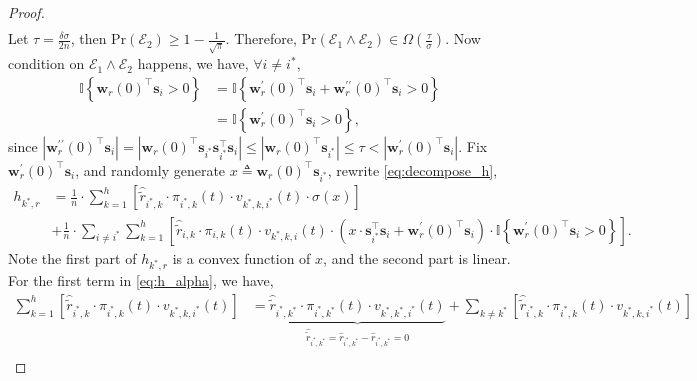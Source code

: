 \documentclass[10pt]{article}
\def\rvs{{\mathbf{s}}}
\def\rvw{{\mathbf{w}}}
\def\pr{{\text{Pr}}}
\def\sI{{\mathbb{I}}}
\def\gE{{\mathcal{E}}}
\begin{document}
\begin{proof}
\begin{equation*}
\begin{split}
\end{split}
\end{equation*}
Let $\tau = \frac{\delta\sigma}{2n}$, then $\pr\left(\gE_2\right) \ge 1 - \frac{1}{\sqrt{\pi}}$. Therefore, $\pr\left( \gE_1 \land \gE_2 \right) \in \Omega\left( \frac{\tau}{\sigma} \right)$. Now condition on $\gE_1 \land \gE_2$ happens, we have, $\forall i \not= i^*$,
\begin{equation*}
\begin{split}
	\sI\left\{ \rvw_r(0)^\top \rvs_i > 0 \right\} &= \sI\left\{ \rvw_r^\prime(0)^\top \rvs_i + \rvw_r^{\prime\prime}(0)^\top \rvs_{i} > 0 \right\} \\
	&= \sI\left\{ \rvw_r^\prime(0)^\top \rvs_i > 0 \right\},
\end{split}
\end{equation*}
since $\left| \rvw_r^{\prime\prime}(0)^\top \rvs_{i} \right| = \left| \rvw_r(0)^\top \rvs_{i^*} \rvs_{i^*}^\top \rvs_{i} \right| \le \left| \rvw_r(0)^\top \rvs_{i^*} \right| \le \tau < \left| \rvw_r^\prime(0)^\top \rvs_i  \right|$. Fix $\rvw_r^\prime(0)^\top \rvs_i$, and randomly generate $x \triangleq \rvw_r(0)^\top \rvs_{i^*}$, rewrite \cref{eq:decompose_h},
\begin{equation}
\label{eq:h_alpha}
\begin{split}
	h_{k^*,r} &= \frac{1}{n} \cdot \sum\limits_{k=1}^{h}{ \left[ \hat{\tilde{r}}_{i^*,k} \cdot \pi_{i^*,k}(t) \cdot v_{k^*,k,i^*}(t) \cdot \sigma(x) \right] } \\
	&+ \frac{1}{n} \cdot \sum\limits_{i \not= i^*}{\sum\limits_{k=1}^{h}{ \left[ \hat{\tilde{r}}_{i,k} \cdot \pi_{i,k}(t) \cdot v_{k^*,k,i}(t) \cdot ( x \cdot \rvs_{i^*}^\top \rvs_{i} + \rvw_r^\prime(0)^\top \rvs_i ) \cdot \sI\left\{ \rvw_r^\prime(0)^\top \rvs_i > 0 \right\}  \right] } }.
\end{split}
\end{equation}
Note the first part of $h_{k^*,r}$ is a convex function of $x$, and the second part is linear. For the first term in \cref{eq:h_alpha}, we have,
\begin{equation*}
\begin{split}
	\sum\limits_{k=1}^{h}{ \left[ \hat{\tilde{r}}_{i^*,k} \cdot \pi_{i^*,k}(t) \cdot v_{k^*,k,i^*}(t) \right] } &= \underbrace{\hat{\tilde{r}}_{i^*,k^*} \cdot \pi_{i^*,k^*}(t) \cdot v_{k^*,k^*,i^*}(t)}_{\hat{\tilde{r}}_{i^*,k^*} = \hat{r}_{i^*,k^*} -  \hat{r}_{i^*,k^*} = 0} + \sum\limits_{k\not=k^*}{ \left[ \hat{\tilde{r}}_{i^*,k} \cdot \pi_{i^*,k}(t) \cdot v_{k^*,k,i^*}(t) \right] } \\

\end{split}
\end{equation*}
\end{proof}
\end{document}
